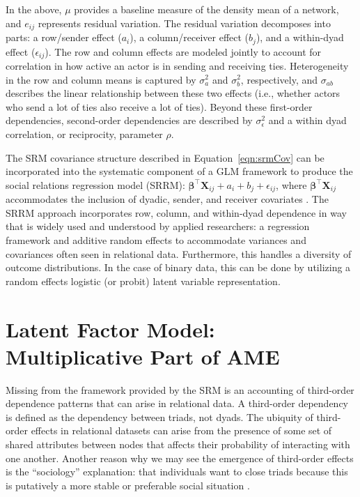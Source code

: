 \documentclass[12pt,twocolumn,twoside]{pnas-new}
\begin{document}
In the above, $\mu$ provides a baseline measure of the density mean of a network, and $e_{ij}$ represents residual variation. The residual variation decomposes into parts: a row/sender effect ($a_{i}$), a column/receiver effect ($b_{j}$), and a within-dyad effect ($\epsilon_{ij}$). The row and column effects are modeled jointly to account for correlation in how active an actor is in sending and receiving ties. Heterogeneity in the row and column means is captured by $\sigma_{a}^{2}$ and $\sigma_{b}^{2}$, respectively, and $\sigma_{ab}$ describes the linear relationship between these two effects (i.e., whether actors who send  a lot of ties also receive  a lot of ties). Beyond these first-order dependencies, second-order dependencies are described by $\sigma_{\epsilon}^{2}$ and a within dyad correlation, or reciprocity, parameter $\rho$. 

The SRM covariance structure described in Equation~\ref{eqn:srmCov} can be incorporated into the systematic component of a GLM framework to produce the social relations regression model (SRRM): $\bm\beta^{\top} \mathbf{X}_{ij} + a_{i} + b_{j} + \epsilon_{ij}$, where $ \bm\beta^{\top} \mathbf{X}_{ij}$ accommodates the inclusion of dyadic, sender, and receiver covariates \citep{hoff:2005}. The SRRM approach incorporates row, column, and within-dyad dependence in way that is widely used and understood by applied researchers: a regression framework and additive random effects to accommodate variances and covariances often seen in relational data. Furthermore, this  handles a diversity of outcome distributions. In the case of binary data, this can be done by utilizing a random effects logistic (or probit) latent variable representation.

\section*{Latent Factor Model: Multiplicative Part of AME}

Missing from the framework provided by the SRM is an accounting of third-order dependence patterns that can arise in relational data. A third-order dependency is defined as the dependency between triads, not dyads. The ubiquity of third-order effects in relational datasets can arise from the presence of some set of shared attributes between nodes that affects their probability of interacting with one another. Another reason why we may see the emergence of third-order effects is the ``sociology'' explanation: that individuals want to close triads because this is putatively a more stable or preferable social situation \citep{wasserman:faust:1994}.
\end{document}
